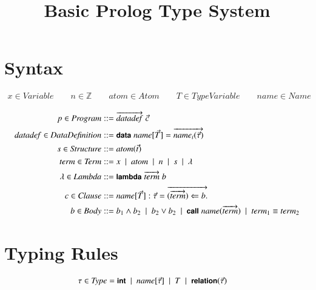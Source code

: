 \documentclass[10pt]{article}
\newcommand{\alt}{\ \mid\ }
\newcommand{\mtt}[1]{\ensuremath{\mathit{#1}}}
\newcommand{\anywhere}[1]{\ensuremath{\mbox{#1}}}
\newcommand{\kw}[1]{\anywhere{\sffamily{\bfseries\small {#1}}}}
\newcommand{\term}{\ensuremath{\mtt{term}}\xspace}
\newcommand{\atom}{\ensuremath{\mtt{atom}}\xspace}
\newcommand{\name}{\ensuremath{\mtt{name}}\xspace}
\newcommand{\datadef}{\ensuremath{\mtt{datadef}}\xspace}
\begin{document}
\title{Basic Prolog Type System}
\author{}
\date{}

\maketitle

\section{Syntax}

\begin{gather*}
  x \in \mtt{Variable} \qquad n \in \mathbb{Z} \qquad \atom \in \mtt{Atom} \qquad T \in \mtt{TypeVariable} \qquad \name \in \mtt{Name}
\end{gather*}

\begin{align*}
  p \in \mtt{Program} &::= \overrightarrow{\datadef}\;\vec{c}
  \\
  \datadef \in \mtt{DataDefinition} &::= \kw{data}\; \name[\vec{T}] = \overrightarrow{\name_i(\vec{\tau})}
  \\
  s \in \mtt{Structure} &::= \atom(\vec{t})
  \\
  \term \in \mtt{Term} &::= x \alt \atom \alt n \alt s \alt \lambda
  \\
  \lambda \in \mtt{Lambda} &::= \kw{lambda}\;\overrightarrow{\term}\;b
  \\
  c \in \mtt{Clause} &::= \name[\vec{T}] : \vec{\tau} = \overrightarrow{(\overrightarrow{\term}) \Leftarrow b.}
  \\
  b \in \mtt{Body} &::= b_1 \land b_2 \alt b_2 \lor b_2
  \alt \kw{call}\;\name(\overrightarrow{\term}) \alt \term_1 \equiv \term_2
\end{align*}

\section{Typing Rules}
\begin{align*}
  \tau \in \mtt{Type} &= \kw{int} \alt \name[\vec{\tau}] \alt T \alt \kw{relation}(\vec{\tau})
\end{align*}
\end{document}
